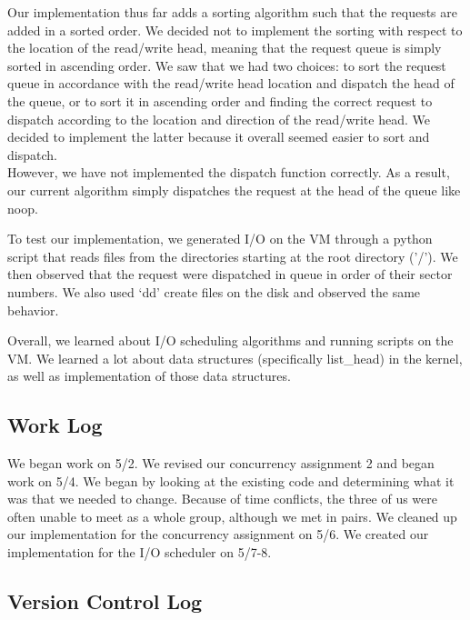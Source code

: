 \documentclass[journal, letterpaper, draftclsnofoot, onecolumn, 10pt]{IEEEtran}
\begin{document}
Our implementation thus far adds a sorting algorithm such that the requests are added in a sorted order. We decided not to implement
the sorting with respect to the location of the read/write head, meaning that the request queue is simply sorted in ascending order.
We saw that we had two choices: to sort the request queue in accordance with the read/write head location and dispatch the head of
the queue, or to sort it in ascending order and finding the correct request to dispatch according to the location and direction of
the read/write head. We decided to implement the latter because it overall seemed easier to sort and dispatch. \\

However, we have not implemented the dispatch function correctly. As a result, our current algorithm simply dispatches the request
at the head of the queue like noop.


To test our implementation, we generated I/O on the VM through a python script that reads files from the directories starting at the
root directory ('/'). We then observed that the request were dispatched in queue in order of their sector numbers. We also used `dd'
create files on the disk and observed the same behavior. 



Overall, we learned about I/O scheduling algorithms and running scripts on the VM. We learned a lot about data structures
(specifically list\_head) in the kernel, as well as implementation of those data structures.\\

\subsection{Work Log}
We began work on 5/2. We revised our concurrency assignment 2 and began work on 5/4. We began by looking
at the existing code and determining what it was that we needed to change. Because of time conflicts, the three of us were often unable
to meet as a whole group, although we met in pairs. We cleaned up our implementation for the concurrency assignment on 5/6.
We created our implementation for the I/O scheduler on 5/7-8.

\clearpage
\subsection{Version Control Log}



\FloatBarrier
\end{document}

